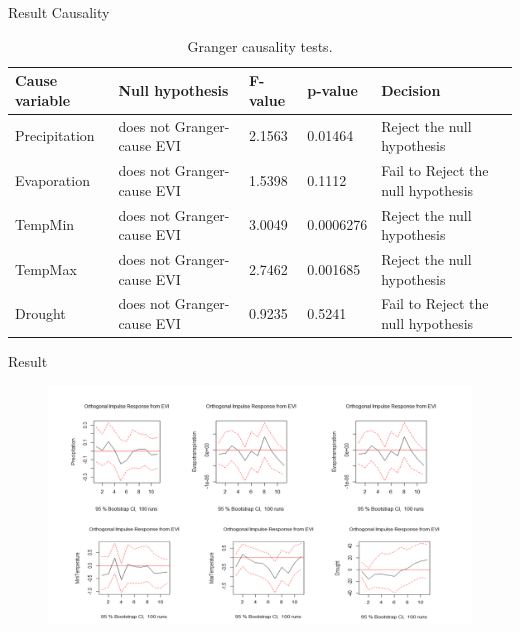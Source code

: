 \documentclass[11pt]{beamer}
\begin{document}
\begin{frame}{Result Causality}
	\begin{table}[]
		\label{Optimal lag}
		\caption{Granger causality tests.}
		\centering
		\small
		\addtolength{\tabcolsep}{-4pt}
		\begin{tabularx}{\textwidth}{@{}lllll@{}}
			\hline
			Cause variable &Null hypothesis& F-value& p-value& Decision\\
			\hline\hline
			Precipitation	& does not Granger-cause EVI &2.1563  & 0.01464  & Reject the null hypothesis  \\
			\hline
			Evaporation	& does not Granger-cause EVI & 1.5398 & 0.1112 &Fail to Reject the null hypothesis  \\
			\hline
			TempMin	&  does not Granger-cause EVI&3.0049  & 0.0006276 &Reject the null hypothesis  \\
			\hline
			TempMax	& does not Granger-cause EVI&2.7462  & 0.001685 &Reject the null hypothesis  \\
			\hline
			Drought	& does not Granger-cause EVI & 0.9235 & 0.5241 &Fail to Reject the null hypothesis \\
			\hline
		\end{tabularx}
	\end{table}
\end{frame}
\begin{frame}{Result}
	\begin{figure}
		\centering
		\includegraphics[width=0.7\linewidth]{images/impose}
		\caption{}
		\label{fig:impose}
	\end{figure}
	
\end{frame}
\end{document}
